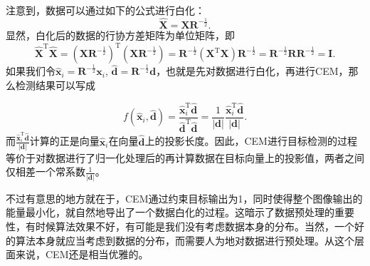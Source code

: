 注意到，数据可以通过如下的公式进行白化：
\begin{equation}
    \hat{\mathbf{X}} = \mathbf{X}\mathbf{R}^{-\frac{1}{2}}.
\end{equation}
显然，白化后的数据的行协方差矩阵为单位矩阵，即
\begin{equation}
    \hat{\mathbf{X}}^{\mathrm{T}}\hat{\mathbf{X}} = (\mathbf{X}\mathbf{R}^{-\frac{1}{2}})^{\mathrm{T}} (\mathbf{X}\mathbf{R}^{-\frac{1}{2}}) = \mathbf{R}^{-\frac{1}{2}} (\mathbf{X}^{\mathrm{T}} \mathbf{X}) \mathbf{R}^{-\frac{1}{2}} = \mathbf{R}^{-\frac{1}{2}} \mathbf{R} \mathbf{R}^{-\frac{1}{2}} = \mathbf{I}.
\end{equation}
如果我们令\(\hat{\mathbf{x}}_{i} = \mathbf{R}^{-\frac{1}{2}}\mathbf{x}_{i}\), \(\hat{\mathbf{d}} = \mathbf{R}^{-\frac{1}{2}} \mathbf{d}\)，也就是先对数据进行白化，再进行CEM，那么检测结果可以写成

\begin{equation}
    f(\hat{\mathbf{x}}_{i}, \hat{\mathbf{d}}) = \frac{\hat{\mathbf{x}}_{i}^{\mathrm{T}}\hat{\mathbf{d}}}{\hat{\mathbf{d}}^{\mathrm{T}}\hat{\mathbf{d}}} = \frac{1}{|\mathbf{d}|} \frac{\hat{\mathbf{x}}_{i}^{\mathrm{T}}\hat{\mathbf{d}}}{|\mathbf{d}|}.
\end{equation}
而\(\frac{\hat{\mathbf{x}}_{i}^{\mathrm{T}}\hat{\mathbf{d}}}{|\mathbf{d}|}\)计算的正是向量\(\hat{\mathbf{x}}_{i}\)在向量\(\hat{\mathbf{d}}\)上的投影长度。因此，CEM进行目标检测的过程等价于对数据进行了归一化处理后的再计算数据在目标向量上的投影值，两者之间仅相差一个常系数\(\frac{1}{|\mathbf{d}|}\)。 

不过有意思的地方就在于，CEM通过约束目标输出为1，同时使得整个图像输出的能量最小化，就自然地导出了一个数据白化的过程。这暗示了数据预处理的重要性，有时候算法效果不好，有可能是我们没有考虑数据本身的分布。当然，一个好的算法本身就应当考虑到数据的分布，而需要人为地对数据进行预处理。从这个层面来说，CEM还是相当优雅的。
